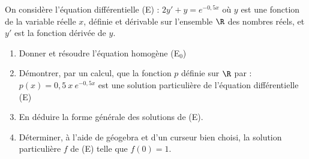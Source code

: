 On considère l’équation différentielle (E) : $2y' + y = e^{-0,5x}$ où $y$ est une fonction de la variable réelle $x$, définie et dérivable sur l’ensemble $\R$ des nombres réels, et $y'$ est la fonction dérivée de $y$.

\begin{enumerate}
	\item Donner et résoudre l'équation homogène (E$_0$)\sautp

	\item Démontrer, par un calcul, que la fonction $p$ définie sur $\R$ par : $p(x) = 0,5~x~e^{-0,5x}$ est une solution particulière de l'équation différentielle (E)\sautp

	\item En déduire la forme générale des solutions de (E).\sautp

	\item Déterminer, à l'aide de géogebra et d'un curseur bien choisi, la solution particulière $f$ de (E) telle que $f(0)=1$.\sautp

	
	\appelprof
\end{enumerate}